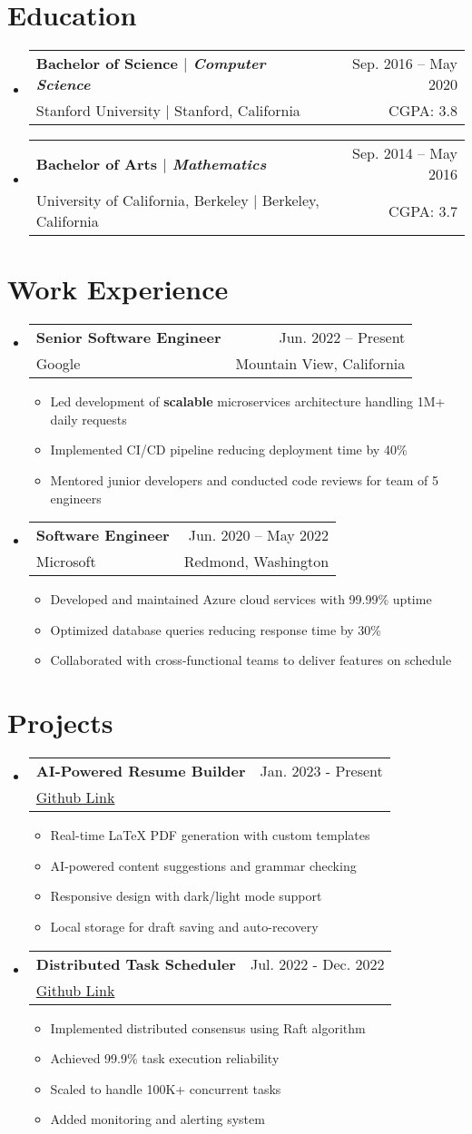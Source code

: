 \documentclass[A4,11pt]{article}
\makeatletter
\newcommand{\CVItem}[1]{
\item\small{
  {#1 \vspace{-2pt}}
}
}
\newcommand{\CVSubheading}[4]{
\vspace{-2pt}\item
  \begin{tabular*}{0.97\textwidth}[t]{l@{\extracolsep{\fill}}r}
    \textbf{#1} & #2 \\
    \small#3 & \small #4 \\
  \end{tabular*}\vspace{-7pt}
}
\newcommand{\CVSubHeadingListStart}{\begin{itemize}[leftmargin=0.5cm, label={}]}
\newcommand{\CVSubHeadingListEnd}{\end{itemize}}
\newcommand{\CVItemListStart}{\begin{itemize}}
\newcommand{\CVItemListEnd}{\end{itemize}\vspace{-5pt}}
\makeatother
\begin{document}
\section{Education}
\CVSubHeadingListStart
\CVSubheading
    {{Bachelor of Science $|$ \emph{\small{Computer Science}}}} {Sep. 2016 -- May 2020}
    {Stanford University $|$ Stanford, California}{CGPA: 3.8}
  \CVSubheading
    {{Bachelor of Arts $|$ \emph{\small{Mathematics}}}} {Sep. 2014 -- May 2016}
    {University of California, Berkeley $|$ Berkeley, California}{CGPA: 3.7}
  
\CVSubHeadingListEnd

\section{Work Experience}
  \CVSubHeadingListStart
  \CVSubheading
    {Senior Software Engineer}{Jun. 2022 -- Present}
    {Google}{Mountain View, California}
    \CVItemListStart
      \CVItem{Led development of \textbf{scalable} microservices architecture handling 1M+ daily requests}\CVItem{Implemented CI/CD pipeline reducing deployment time by 40\%}\CVItem{Mentored junior developers and conducted code reviews for team of 5 engineers}
    \CVItemListEnd
      \CVSubheading
    {Software Engineer}{Jun. 2020 -- May 2022}
    {Microsoft}{Redmond, Washington}
    \CVItemListStart
      \CVItem{Developed and maintained Azure cloud services with 99.99\% uptime}\CVItem{Optimized database queries reducing response time by 30\%}\CVItem{Collaborated with cross-functional teams to deliver features on schedule}
    \CVItemListEnd
      
  \CVSubHeadingListEnd
  


\section{Projects}
\CVSubHeadingListStart
\CVSubheading
    {AI-Powered Resume Builder}{Jan. 2023 - Present}
    {\href{https://github.com/username/resume-builder}{\color{blue}Github Link}}{}
    \CVItemListStart
      \CVItem{Real-time LaTeX PDF generation with custom templates}\CVItem{AI-powered content suggestions and grammar checking}\CVItem{Responsive design with dark/light mode support}\CVItem{Local storage for draft saving and auto-recovery}
    \CVItemListEnd
\CVSubheading
    {Distributed Task Scheduler}{Jul. 2022 - Dec. 2022}
    {\href{https://github.com/username/task-scheduler}{\color{blue}Github Link}}{}
    \CVItemListStart
      \CVItem{Implemented distributed consensus using Raft algorithm}\CVItem{Achieved 99.9\% task execution reliability}\CVItem{Scaled to handle 100K+ concurrent tasks}\CVItem{Added monitoring and alerting system}
    \CVItemListEnd
\CVSubHeadingListEnd
\end{document}
